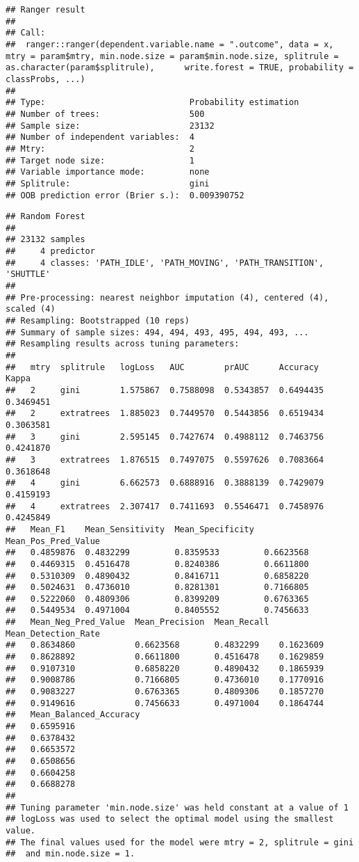 \documentclass[]{article}
\begin{document}
\begin{verbatim}
## Ranger result
## 
## Call:
##  ranger::ranger(dependent.variable.name = ".outcome", data = x,      mtry = param$mtry, min.node.size = param$min.node.size, splitrule = as.character(param$splitrule),      write.forest = TRUE, probability = classProbs, ...) 
## 
## Type:                             Probability estimation 
## Number of trees:                  500 
## Sample size:                      23132 
## Number of independent variables:  4 
## Mtry:                             2 
## Target node size:                 1 
## Variable importance mode:         none 
## Splitrule:                        gini 
## OOB prediction error (Brier s.):  0.009390752
\end{verbatim}

\begin{verbatim}
## Random Forest 
## 
## 23132 samples
##     4 predictor
##     4 classes: 'PATH_IDLE', 'PATH_MOVING', 'PATH_TRANSITION', 'SHUTTLE' 
## 
## Pre-processing: nearest neighbor imputation (4), centered (4), scaled (4) 
## Resampling: Bootstrapped (10 reps) 
## Summary of sample sizes: 494, 494, 493, 495, 494, 493, ... 
## Resampling results across tuning parameters:
## 
##   mtry  splitrule   logLoss   AUC        prAUC      Accuracy   Kappa    
##   2     gini        1.575867  0.7588098  0.5343857  0.6494435  0.3469451
##   2     extratrees  1.885023  0.7449570  0.5443856  0.6519434  0.3063581
##   3     gini        2.595145  0.7427674  0.4988112  0.7463756  0.4241870
##   3     extratrees  1.876515  0.7497075  0.5597626  0.7083664  0.3618648
##   4     gini        6.662573  0.6888916  0.3888139  0.7429079  0.4159193
##   4     extratrees  2.307417  0.7411693  0.5546471  0.7458976  0.4245849
##   Mean_F1    Mean_Sensitivity  Mean_Specificity  Mean_Pos_Pred_Value
##   0.4859876  0.4832299         0.8359533         0.6623568          
##   0.4469315  0.4516478         0.8240386         0.6611800          
##   0.5310309  0.4890432         0.8416711         0.6858220          
##   0.5024631  0.4736010         0.8281301         0.7166805          
##   0.5222060  0.4809306         0.8399209         0.6763365          
##   0.5449534  0.4971004         0.8405552         0.7456633          
##   Mean_Neg_Pred_Value  Mean_Precision  Mean_Recall  Mean_Detection_Rate
##   0.8634860            0.6623568       0.4832299    0.1623609          
##   0.8628892            0.6611800       0.4516478    0.1629859          
##   0.9107310            0.6858220       0.4890432    0.1865939          
##   0.9008786            0.7166805       0.4736010    0.1770916          
##   0.9083227            0.6763365       0.4809306    0.1857270          
##   0.9149616            0.7456633       0.4971004    0.1864744          
##   Mean_Balanced_Accuracy
##   0.6595916             
##   0.6378432             
##   0.6653572             
##   0.6508656             
##   0.6604258             
##   0.6688278             
## 
## Tuning parameter 'min.node.size' was held constant at a value of 1
## logLoss was used to select the optimal model using the smallest value.
## The final values used for the model were mtry = 2, splitrule = gini
##  and min.node.size = 1.
\end{verbatim}
\end{document}
